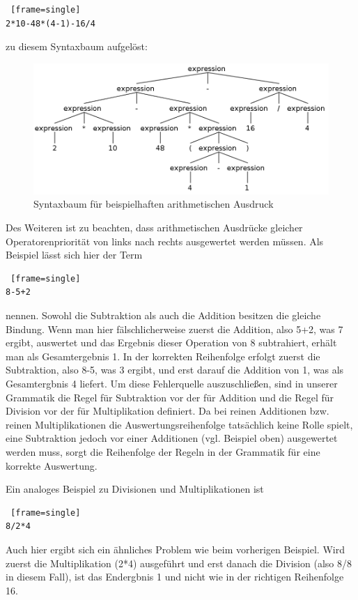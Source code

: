 \begin{lstlisting} [frame=single]
2*10-48*(4-1)-16/4
\end{lstlisting}

zu diesem Syntaxbaum aufgelöst:

\begin{figure}[h!]
\centering
\includegraphics[scale=0.4]{pics/antlr4_parse_tree_arithmetic.png}
\caption{Syntaxbaum für beispielhaften arithmetischen Ausdruck}
\label{fig:method}
\end{figure}

Des Weiteren ist zu beachten, dass arithmetischen Ausdrücke gleicher Operatorenpriorität von links  nach rechts ausgewertet werden müssen. Als Beispiel lässt sich hier der Term 
\begin{lstlisting} [frame=single]
8-5+2
\end{lstlisting}
nennen. Sowohl die Subtraktion als auch die Addition besitzen die gleiche Bindung. Wenn man hier fälschlicherweise zuerst die Addition, also 5+2, was 7 ergibt, auswertet und das Ergebnis dieser Operation von 8 subtrahiert, erhält man als Gesamtergebnis 1. 
In der korrekten Reihenfolge erfolgt zuerst die Subtraktion, also 8-5, was 3 ergibt, und erst darauf die Addition von 1, was als Gesamtergbnis 4 liefert. 
Um diese Fehlerquelle auszuschließen, sind in unserer Grammatik die Regel für Subtraktion vor der für Addition und die Regel für Division vor der für Multiplikation definiert. Da bei reinen Additionen bzw. reinen Multiplikationen die Auswertungsreihenfolge tatsächlich keine Rolle spielt, eine Subtraktion jedoch vor einer Additionen (vgl. Beispiel oben) ausgewertet werden muss, sorgt die Reihenfolge der Regeln in der Grammatik für eine korrekte Auswertung.

Ein analoges Beispiel zu Divisionen und Multiplikationen ist
\begin{lstlisting} [frame=single]
8/2*4
\end{lstlisting}
Auch hier ergibt sich ein ähnliches Problem wie beim vorherigen Beispiel. Wird zuerst die Multiplikation (2*4) ausgeführt und erst danach die Division (also 8/8 in diesem Fall), ist das Endergbnis 1 und nicht wie in der richtigen Reihenfolge 16.

